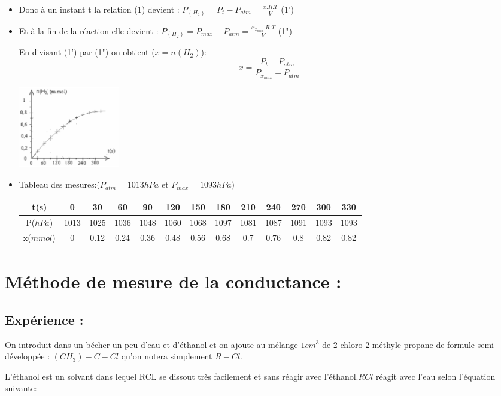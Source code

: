 \documentclass[12pt]{article}
\begin{document}
\begin{itemize}
\item Donc à un instant t la relation (1) devient : $ P_{(H_2)}= P_t-P_{atm} = \frac{x.R.T}{V}$ (1')

\item Et à la fin de la réaction elle devient : $ P_{(H_2)}= P_{max}-P_{atm} = \frac{x_{x_{max}}.R.T}{V}$ (1")

	En divisant (1') par (1") on obtient ($x = n(H_2)$): $$x = \frac{P_t-P_{atm}}{P_{x_{max}}-P_{atm}}$$ 

\begin{center}
	\includegraphics[width=0.2\textwidth]{./img/STcourbepressionH_2.png}
\end{center}

	
\item Tableau des mesures:($P_{atm}=1013hPa$ et $P_{max}=1093hPa$) 

\begin{center}
   \begin{tabular}{|c|c|c|c|c|c|c|c|c|c|c|c|c|}
	  \hline
	  t(s)       &0     &30  &60  &90  &120 &150 &180 &210 &240 &270 &300&330 \\\hline
	  P($hPa$)   &1013  &1025&1036&1048&1060&1068&1097&1081&1087&1091&1093&1093\\\hline
	  x($mmol$)  &0     &0.12&0.24&0.36&0.48&0.56&0.68&0.7&0.76 &0.8 &0.82& 0.82\\\hline
   \end{tabular}
\end{center}
\end{itemize}

\section{Méthode de mesure de la conductance : }
\subsection{Expérience : }
On introduit dans un bécher un peu d'eau et d'éthanol et on ajoute au mélange $1cm^3$ de 2-chloro 2-méthyle propane de formule semi-développée : $(CH_3)-C-Cl$ qu’on notera simplement $R-Cl$.

L'éthanol est un solvant dans lequel RCL se dissout très facilement et sans réagir avec l'éthanol.$RCl$ réagit avec l'eau selon
l'équation suivante: 
\end{document}
